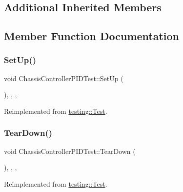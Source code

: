 \subsection*{Additional Inherited Members}


\subsection{Member Function Documentation}
\mbox{\label{classChassisControllerPIDTest_a6504206d2aa7e3984e5f23177507935f}} 
\subsubsection{\texorpdfstring{SetUp()}{SetUp()}}
{\footnotesize\ttfamily void Chassis\+Controller\+P\+I\+D\+Test\+::\+Set\+Up (\begin{DoxyParamCaption}{ }\end{DoxyParamCaption})\hspace{0.3cm}{\ttfamily [inline]}, {\ttfamily [override]}, {\ttfamily [protected]}, {\ttfamily [virtual]}}



Reimplemented from \mbox{\hyperlink{classtesting_1_1Test_a190315150c303ddf801313fd1a777733}{testing\+::\+Test}}.

\mbox{\label{classChassisControllerPIDTest_adb3cad516288f90a2a843086d478d1bc}} 
\subsubsection{\texorpdfstring{TearDown()}{TearDown()}}
{\footnotesize\ttfamily void Chassis\+Controller\+P\+I\+D\+Test\+::\+Tear\+Down (\begin{DoxyParamCaption}{ }\end{DoxyParamCaption})\hspace{0.3cm}{\ttfamily [inline]}, {\ttfamily [override]}, {\ttfamily [protected]}, {\ttfamily [virtual]}}



Reimplemented from \mbox{\hyperlink{classtesting_1_1Test_a5f0ab439802cbe0ef7552f1a9f791923}{testing\+::\+Test}}.



